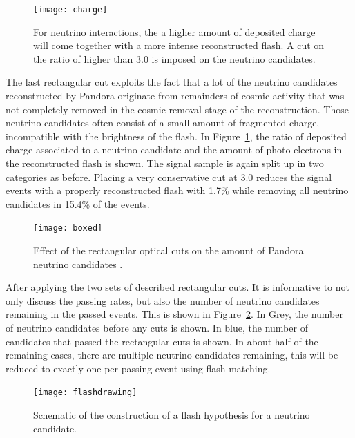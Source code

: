 \begin{figure}[!htbp]
\centering
\texttt{[image: charge]}
\caption{For neutrino interactions, the a higher amount of deposited charge will come together with a more intense reconstructed flash. A cut on the ratio of higher than 3.0 is imposed on the neutrino candidates.} 
\label{fig:charge}
\end{figure}

The last rectangular cut exploits the fact that a lot of the neutrino candidates reconstructed by Pandora originate from remainders of cosmic activity that was not completely removed in the cosmic removal stage of the reconstruction. Those neutrino candidates often consist of a small amount of fragmented charge, incompatible with the brightness of the flash. In Figure~\ref{fig:charge}, the ratio of deposited charge associated to a neutrino candidate and the  amount of photo-electrons in the reconstructed flash is shown. The signal sample is again split up in two categories as before. Placing a very conservative cut at 3.0 reduces the signal events with a properly reconstructed flash with 1.7\% while removing all neutrino candidates in 15.4\% of the events. 

\begin{figure}[!htbp]
\centering
\texttt{[image: boxed]}
\caption{Effect of the rectangular optical cuts on the amount of Pandora neutrino candidates .} 
\label{fig:boxed}
\end{figure}

After applying the two sets of described rectangular cuts. It is informative to not only discuss the passing rates, but also the number of neutrino candidates remaining in the passed events. This is shown in Figure~\ref{fig:boxed}. In Grey, the number of neutrino candidates before any cuts is shown. In blue, the number of candidates that passed the rectangular cuts is shown. In about half of the remaining cases, there are multiple neutrino candidates remaining, this will be reduced to exactly one per passing event using flash-matching. 

\begin{figure}[!htbp]
\centering
\texttt{[image: flashdrawing]} 
\caption{Schematic of the construction of a flash hypothesis for a neutrino candidate.} 
\label{fig:flashdrawing}
\end{figure}

